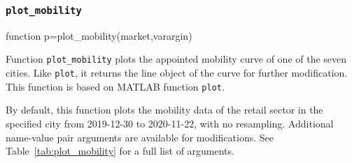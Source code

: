 \documentclass[10pt]{article}
\newcommand{\matlab}{\textsc{MATLAB}}
\numberwithin{equation}{section}
\numberwithin{table}{section}
\numberwithin{figure}{section}
\begin{document}
\subsubsection{\texttt{plot\_mobility}}\label{func:plot_mobility}

\begin{Code}
function p=plot_mobility(market,varargin)
\end{Code}

Function \verb!plot_mobility! plots the appointed mobility curve of one of the seven cities. Like \verb!plot!, it returns the line object of the curve for further modification. This function is based on \matlab{} function \verb!plot!.

By default, this function plots the mobility data of the retail sector in the specified city from 2019-12-30 to 2020-11-22, with no resampling. Additional name-value pair arguments are available for modifications. See Table~\ref{tab:plot_mobility} for a full list of arguments.
\end{document}
